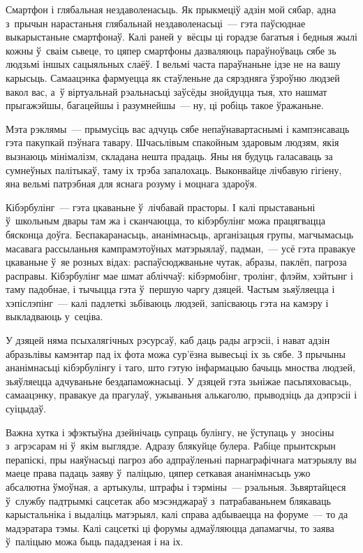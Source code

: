 Смартфон і глябальная нездаволенасьць. Як прыкмеціў адзін мой сябар, адна з~прычын нарастаньня глябальнай нездаволенасьці~--- гэта паўсюднае выкарыстаньне смартфонаў. Калі раней у~вёсцы ці горадзе багатыя і бедныя жылі кожны ў~сваім сьвеце, то цяпер смартфоны дазваляюць параўноўваць сябе зь людзьмі іншых сацыяльных слаёў. І вельмі часта параўнаньне ідзе не на вашу карысьць. Самаацэнка фармуецца як стаўленьне да сярэдняга ўзроўню людзей вакол вас, а~ў віртуальнай рэальнасьці заўсёды знойдуцца тыя, хто нашмат прыгажэйшы, багацейшы і разумнейшы~--- ну, ці робіць такое ўражаньне.

Мэта рэклямы~--- прымусіць вас адчуць сябе непаўнавартаснымі і кампэнсаваць гэта пакупкай пэўнага тавару. Шчасьлівым спакойным здаровым людзям, якія вызнаюць мінімалізм, складана нешта прадаць. Яны ня будуць галасаваць за сумнеўных палітыкаў, таму іх трэба запалохаць. Выконвайце лічбавую гігіену, яна вельмі патрэбная для яснага розуму і моцнага здароўя.

Кібэрбулінг~--- гэта цкаваньне ў~лічбавай прасторы. І калі прыставаньні ў~школьным двары там жа і сканчаюцца, то кібэрбулінг можа працягвацца бясконца доўга. Беспакаранасьць, ананімнасьць, арганізацыя групы, магчымасьць масавага рассыланьня кампрамэтоўных матэрыялаў, падман,~--- усё гэта правакуе цкаваньне ў~яе розных відах: распаўсюджваньне чутак, абразы, паклёп, пагроза расправы. Кібэрбулінг мае шмат абліччаў: кібэрмобінг, тролінг, флэйм, хэйтынг і таму падобнае, і тычыцца гэта ў~першую чаргу дзяцей. Частым зьяўляецца і хэпіслэпінг~--- калі падлеткі зьбіваюць людзей, запісваюць гэта на камэру і выкладваюць у~сеціва.

У дзяцей няма псыхалягічных рэсурсаў, каб даць рады агрэсіі, і нават адзін абразьлівы камэнтар пад іх фота можа сур'ёзна вывесьці іх зь сябе. З прычыны ананімнасьці кібэрбулінгу і таго, што гэтую інфармацыю бачыць мноства людзей, зьяўляецца адчуваньне бездапаможнасьці. У дзяцей гэта зьніжае пасьпяховасьць, самаацэнку, правакуе да прагулаў, ужываньня алькаголю, прыводзіць да дэпрэсіі і суіцыдаў.

Важна хутка і эфэктыўна дзейнічаць супраць булінгу, не ўступаць у~зносіны з~агрэсарам ні ў~якім выглядзе. Адразу блякуйце булера. Рабіце прынтскрын перапіскі, пры наяўнасьці пагроз або адпраўленьні парнаграфічнага матэрыялу вы маеце права падаць заяву ў~паліцыю, цяпер сеткавая ананімнасьць ужо абсалютна ўмоўная, а~артыкулы, штрафы і тэрміны~--- рэальныя. Зьвяртайцеся ў~службу падтрымкі сацсетак або мэсэнджараў з~патрабаваньнем блякаваць карыстальніка і выдаліць матэрыял, калі справа адбываецца на форуме~--- то да мадэратара тэмы. Калі сацсеткі ці форумы адмаўляюцца дапамагчы, то заява ў~паліцыю можа быць пададзеная і на іх.


